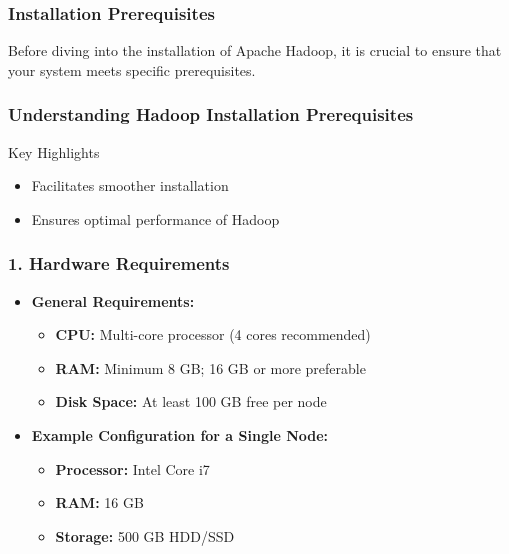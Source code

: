 \documentclass{beamer}
\begin{document}
\begin{frame}[fragile]
    \frametitle{Installation Prerequisites}
    Before diving into the installation of Apache Hadoop, it is crucial to ensure that your system meets specific prerequisites.
\end{frame}

\begin{frame}[fragile]
    \frametitle{Understanding Hadoop Installation Prerequisites}
    \begin{block}{Key Highlights}
        \begin{itemize}
            \item Facilitates smoother installation
            \item Ensures optimal performance of Hadoop
        \end{itemize}
    \end{block}
\end{frame}

\begin{frame}[fragile]
    \frametitle{1. Hardware Requirements}
    \begin{itemize}
        \item \textbf{General Requirements:}
            \begin{itemize}
                \item \textbf{CPU:} Multi-core processor (4 cores recommended)
                \item \textbf{RAM:} Minimum 8 GB; 16 GB or more preferable
                \item \textbf{Disk Space:} At least 100 GB free per node
            \end{itemize}
        \item \textbf{Example Configuration for a Single Node:}
            \begin{itemize}
                \item \textbf{Processor:} Intel Core i7
                \item \textbf{RAM:} 16 GB
                \item \textbf{Storage:} 500 GB HDD/SSD
            \end{itemize}
    \end{itemize}
\end{frame}
\end{document}
